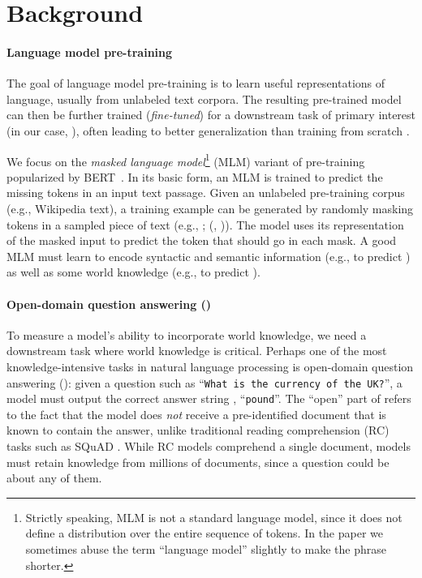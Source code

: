 \documentclass{article}
\begin{document}
 \section{Background}
\label{sec:background}
\paragraph{Language model pre-training}

The goal of language model pre-training is to learn useful representations of language,
usually from unlabeled text corpora.
The resulting pre-trained model can then be further trained (\emph{fine-tuned}) for a downstream task of primary interest (in our case, \openqa),
often leading to better generalization than training from scratch \cite{dai_finetune,gpt2}.

We focus on the {\em masked language model}\footnote{Strictly speaking, MLM is not a standard language model, since it does not define a distribution over the entire sequence of tokens. In the paper we sometimes abuse the term ``language model'' slightly to make the phrase shorter.}
(MLM) variant of pre-training popularized by BERT~\cite{bert}.
In its basic form, an MLM is trained to predict the missing tokens in an input text passage.
Given an unlabeled pre-training corpus  (e.g., Wikipedia text),
a training example  can be generated by randomly masking tokens in a sampled piece of text
(e.g.,  ;  (, )).
The model uses its representation of the masked input  to predict
the token that should go in each mask.
A good MLM must learn to encode syntactic and semantic information (e.g., to predict )
as well as some world knowledge (e.g., to predict ).

\paragraph{Open-domain question answering (\openqa)}
To measure a model's ability to incorporate world knowledge, we need a downstream task where world knowledge is critical.
Perhaps one of the most knowledge-intensive tasks in natural language processing is open-domain question answering (\openqa):
given a question  such as ``\texttt{\small What is the currency of the UK?}'', a model must output the correct answer string , ``\texttt{{\small pound}}''.
The ``open'' part of \openqa refers to the fact that the model does {\em not} receive a pre-identified document that is known to contain the answer, unlike traditional reading comprehension (RC) tasks such as SQuAD \cite{squad, squad2}. While RC models comprehend a single document, \openqa models must retain knowledge from millions of documents, since a question could be about any of them.
\end{document}

